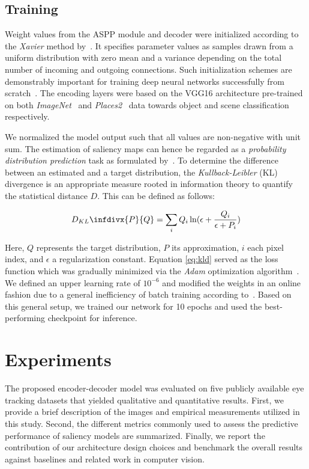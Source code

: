 \documentclass[final,1p,times,number]{elsarticle}
\newcommand{\infdiv}{D_{KL}\infdivx}
\begin{document}
\subsection{Training}

Weight values from the ASPP module and decoder were initialized according to the \textit{Xavier} method by~\citet{glorot2010understanding}. It specifies parameter values as samples drawn from a uniform distribution with zero mean and a variance depending on the total number of incoming and outgoing connections. Such initialization schemes are demonstrably important for training deep neural networks successfully from scratch~\cite{sutskever2013importance}. The encoding layers were based on the VGG16 architecture pre-trained on both \textit{ImageNet}~\cite{deng2009imagenet} and \textit{Places2}~\cite{zhou2017places} data towards object and scene classification respectively.

We normalized the model output such that all values are non-negative with unit sum. The estimation of saliency maps can hence be regarded as a \textit{probability distribution prediction} task as formulated by~\citet{jetley2016end}. To determine the difference between an estimated and a target distribution, the \textit{Kullback-Leibler} (KL) divergence is an appropriate measure rooted in information theory to quantify the statistical distance $D$. This can be defined as follows:

\begin{equation}\label{eq:kld}
\infdiv{P}{Q} = \sum \limits_{i} Q_i \ln (\epsilon + \frac{Q_i}{\epsilon + P_i})
\end{equation}

Here, $Q$ represents the target distribution, $P$ its approximation, $i$ each pixel index, and $\epsilon$ a regularization constant. Equation \eqref{eq:kld} served as the loss function which was gradually minimized via the \textit{Adam} optimization algorithm~\cite{kingma2014adam}. We defined an upper learning rate of $10^{-6}$ and modified the weights in an online fashion due to a general inefficiency of batch training according to~\citet{wilson2003general}. Based on this general setup, we trained our network for 10 epochs and used the best-performing checkpoint for inference.

\section{Experiments}

The proposed encoder-decoder model was evaluated on five publicly available eye tracking datasets that yielded qualitative and quantitative results. First, we provide a brief description of the images and empirical measurements utilized in this study. Second, the different metrics commonly used to assess the predictive performance of saliency models are summarized. Finally, we report the contribution of our architecture design choices and benchmark the overall results against baselines and related work in computer vision.
\end{document}
